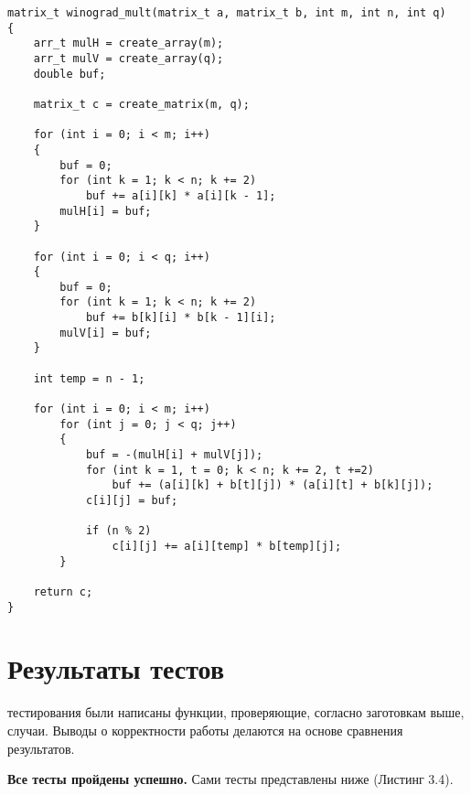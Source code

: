 \begin{lstlisting}[label=code, caption = Оптимизированный алгоритм Винограда]
matrix_t winograd_mult(matrix_t a, matrix_t b, int m, int n, int q)
{
	arr_t mulH = create_array(m);
	arr_t mulV = create_array(q);
	double buf;
	
	matrix_t c = create_matrix(m, q);
	
	for (int i = 0; i < m; i++)
	{
		buf = 0;
		for (int k = 1; k < n; k += 2)
			buf += a[i][k] * a[i][k - 1];
		mulH[i] = buf;
	}
	
	for (int i = 0; i < q; i++)
	{
		buf = 0;
		for (int k = 1; k < n; k += 2)
			buf += b[k][i] * b[k - 1][i];
		mulV[i] = buf;
	}
	
	int temp = n - 1;
	
	for (int i = 0; i < m; i++)
		for (int j = 0; j < q; j++)
		{
			buf = -(mulH[i] + mulV[j]);
			for (int k = 1, t = 0; k < n; k += 2, t +=2)
				buf += (a[i][k] + b[t][j]) * (a[i][t] + b[k][j]);
			c[i][j] = buf;
			
			if (n % 2)
				c[i][j] += a[i][temp] * b[temp][j];
		}
	
	return c;
}
\end{lstlisting}

\section{Результаты тестов}
 тестирования были написаны функции, проверяющие, согласно заготовкам выше, случаи. Выводы о корректности работы делаются на основе сравнения результатов.

\textbf{Все тесты пройдены успешно.} Сами тесты представлены ниже (Листинг 3.4).

